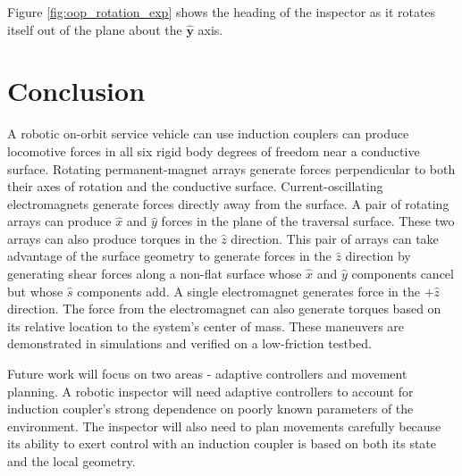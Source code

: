 \documentclass[letterpaper, 10 pt, conference]{ieeeconf}  %
\begin{document}
   \par Figure \ref{fig:oop_rotation_exp} shows the heading of the inspector as it rotates itself out of the plane about the $\hat{\textbf{y}}$ axis.



\section{Conclusion}
A robotic on-orbit service vehicle can use induction couplers can produce locomotive forces in all six rigid body degrees of freedom near a conductive surface. Rotating permanent-magnet arrays generate forces perpendicular to both their axes of rotation and the conductive surface. Current-oscillating electromagnets generate forces directly away from the surface. A pair of rotating arrays can produce $\hat{x}$ and $\hat{y}$ forces in the plane of the traversal surface. These two arrays can also produce torques in the $\hat{z}$ direction. This pair of arrays can take advantage of the surface geometry to generate forces in the $\hat{z}$ direction by generating shear forces along a non-flat surface whose $\hat{x}$ and $\hat{y}$ components cancel but whose $\hat{s}$ components add. A single electromagnet generates force in the $+\hat{z}$ direction. The force from the electromagnet can also generate torques based on its relative location to the system's center of mass. These maneuvers are demonstrated in simulations and verified on a low-friction testbed.  

Future work will focus on two areas - adaptive controllers and movement planning. A robotic inspector will need adaptive controllers to account for induction coupler's strong dependence on poorly known parameters of the environment.  The inspector will also need to plan movements carefully because its ability to exert control with an induction coupler is based on both its state and the local geometry.      
\end{document}
